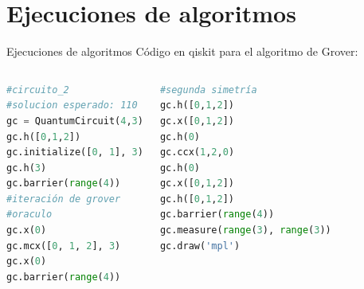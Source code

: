 \documentclass[10pt,compress]{beamer}
\begin{document}
\section{Ejecuciones de algoritmos}

\begin{frame}[fragile]{Ejecuciones de algoritmos}
Código en qiskit para el algoritmo de Grover:
\begin{columns}
\begin{lstlisting}[language=Python]
#circuito_2
#solucion esperado: 110
gc = QuantumCircuit(4,3)
gc.h([0,1,2])
gc.initialize([0, 1], 3)
gc.h(3)
gc.barrier(range(4))
#iteración de grover
#oraculo
gc.x(0)
gc.mcx([0, 1, 2], 3)
gc.x(0)
gc.barrier(range(4))
\end{lstlisting}

\begin{lstlisting}[language=Python]
#segunda simetría
gc.h([0,1,2])
gc.x([0,1,2])
gc.h(0)
gc.ccx(1,2,0)
gc.h(0)
gc.x([0,1,2])
gc.h([0,1,2])
gc.barrier(range(4))
gc.measure(range(3), range(3))
gc.draw('mpl')
\end{lstlisting}

\end{columns}
\end{frame}
\end{document}
